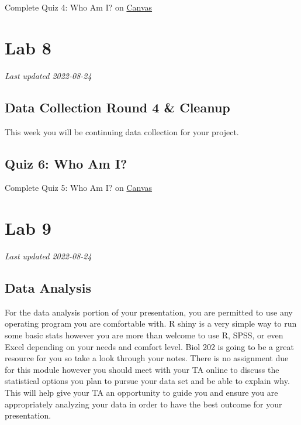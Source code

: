 \documentclass[
]{book}
\begin{document}
Complete Quiz 4: Who Am I? on \href{https://canvas.ubc.ca/courses/113910}{Canvas}

\hypertarget{part-lab-8}{%
\part*{Lab 8}\label{part-lab-8}}

\emph{Last updated 2022-08-24}

\hypertarget{data-collection-round-4-cleanup}{%
\chapter*{Data Collection Round 4 \& Cleanup}\label{data-collection-round-4-cleanup}}

This week you will be continuing data collection for your project.

\hypertarget{quiz-6-who-am-i}{%
\chapter*{Quiz 6: Who Am I?}\label{quiz-6-who-am-i}}

Complete Quiz 5: Who Am I? on \href{https://canvas.ubc.ca/courses/113910}{Canvas}

\hypertarget{part-lab-9}{%
\part*{Lab 9}\label{part-lab-9}}

\emph{Last updated 2022-08-24}

\hypertarget{data-analysis}{%
\chapter*{Data Analysis}\label{data-analysis}}

For the data analysis portion of your presentation, you are permitted to use any operating program you are comfortable with. R shiny is a very simple way to run some basic stats however you are more than welcome to use R, SPSS, or even Excel depending on your needs and comfort level. Biol 202 is going to be a great resource for you so take a look through your notes. There is no assignment due for this module however you should meet with your TA online to discuss the statistical options you plan to pursue your data set and be able to explain why. This will help give your TA an opportunity to guide you and ensure you are appropriately analyzing your data in order to have the best outcome for your presentation.
\end{document}

